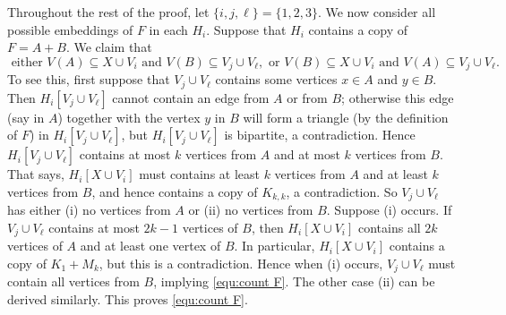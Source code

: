 \documentclass[10pt]{article}
\begin{document}
Throughout the rest of the proof, let $\{i,j,\ell\}=\{1,2,3\}$.
We now consider all possible embeddings of $F$ in each $H_i$.
Suppose that $H_i$ contains a copy of $F=A+B$.
We claim that
\begin{equation}\label{equ:count F}
\mbox{ either } V(A)\subseteq X\cup V_i \mbox{ and } V(B) \subseteq V_j\cup V_\ell, \mbox{ or } V(B)\subseteq X\cup V_i \mbox{ and } V(A) \subseteq V_j\cup V_\ell.
\end{equation}
To see this, first suppose that $V_j\cup V_\ell$ contains some vertices $x\in A$ and $y\in B$.
Then $H_i[V_j\cup V_\ell]$ cannot contain an edge from $A$ or from $B$;
otherwise this edge (say in $A$) together with the vertex $y$ in $B$ will form a triangle (by the definition of $F$) in $H_i[V_j\cup V_\ell]$, but $H_i[V_j\cup V_\ell]$ is bipartite, a contradiction.
Hence $H_i[V_j\cup V_\ell]$ contains at most $k$ vertices from $A$ and at most $k$ vertices from $B$.
That says, $H_i[X\cup V_i]$ must contains at least $k$ vertices from $A$ and at least $k$ vertices from $B$, and hence contains a copy of $K_{k,k}$, a contradiction.
So $V_j\cup V_\ell$ has either (i) no vertices from $A$ or (ii) no vertices from $B$.
Suppose (i) occurs.
If $V_j\cup V_\ell$ contains at most $2k-1$ vertices of $B$, then $H_i[X\cup V_i]$ contains all $2k$ vertices of $A$ and at least one vertex of $B$.
In particular, $H_i[X\cup V_i]$ contains a copy of $K_1+M_k$, but this is a contradiction.
Hence when (i) occurs, $V_j\cup V_\ell$ must contain all vertices from $B$, implying \eqref{equ:count F}.
The other case (ii) can be derived similarly. This proves \eqref{equ:count F}.
\end{document}

